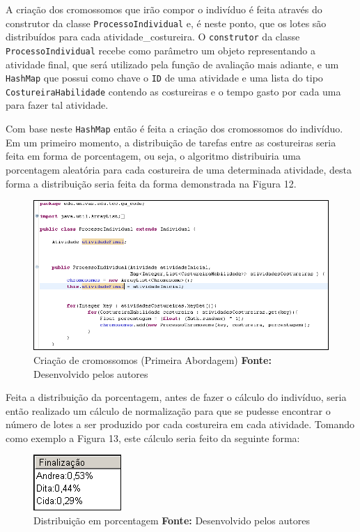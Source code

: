 \par A criação dos cromossomos que irão compor o indivíduo é feita através do construtor da classe 
\texttt{ProcessoIndividual} e, é neste ponto, que os lotes são distribuídos para
cada atividade\_costureira.
O \texttt{construtor} da classe \texttt{ProcessoIndividual} recebe como
parâmetro um objeto representando a atividade final, que será utilizado pela função de avaliação mais adiante, e um \texttt{HashMap} que possui como chave o
\texttt{ID} de uma atividade e uma lista do  tipo \texttt{CostureiraHabilidade} contendo as costureiras e o tempo 
gasto por cada uma para fazer tal atividade.

\par Com base neste \texttt{HashMap} então é feita a criação dos cromossomos do indivíduo.
Em um primeiro momento, a distribuição de tarefas entre as costureiras seria feita em forma 
de porcentagem, ou seja, o algoritmo distribuiria uma porcentagem aleatória para cada costureira de 
uma determinada atividade, desta forma a distribuição seria feita da forma
demonstrada na Figura 12.


\begin{figure}[h!]
	\centerline{\includegraphics[scale=0.7]{./imagens/tentativa_1_individual.png}}
	\caption[Criação de cromossomos (Primeira Abordagem)]
	{Criação de cromossomos (Primeira Abordagem) \textbf{Fonte:} Desenvolvido pelos autores}
	\label{fig:exemplo1}
\end{figure}
 
\par Feita a distribuição da porcentagem, antes de fazer o cálculo do indivíduo, seria então realizado 
um cálculo de normalização para que se pudesse encontrar o número de lotes a ser
produzido por cada costureira em cada atividade. Tomando como exemplo a Figura
13, este cálculo seria feito da seguinte forma:

\begin{figure}[h!]
	\centerline{\includegraphics[scale=1.0]{./imagens/distribuicao_porcentagem.png}}
	\caption[Distribuição em porcentagem]
	{Distribuição em porcentagem \textbf{Fonte:} Desenvolvido pelos autores}
	\label{fig:exemplo1}
\end{figure}

